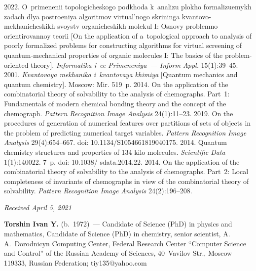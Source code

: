   \begin{multicols}{2}

\renewcommand{\bibname}{\protect\rmfamily References}

{\small\frenchspacing
 {%
 \begin{thebibliography}{9}
 2022. O~primenenii topologicheskogo podkhoda k~analizu plokho 
formalizuemykh zadach dlya postroeniya algoritmov virtual'nogo skrininga  
kvantovo-mekhanicheskikh svoystv organicheskikh molekul I: Osno\-vy problemno 
orientirovannoy teorii [On the application of a~topological approach to analysis of poorly 
formalized problems for constructing algorithms for virtual screening of quantum-mechanical 
properties of organic molecules I: The basics of the problem-oriented theory]. \textit{Informatika 
i~ee Primeneniya~--- Inform Appl.} 15(1):39--45.
 2001. \textit{Kvantovaya mekhanika i~kvantovaya khimiya} [Quantum 
mechanics and quantum chemistry]. Moscow: Mir. 519~p.
 2014. On the application of the combinatorial theory 
of solvability to the analysis of chemographs. Part~1: Fundamentals of modern chemical bonding 
theory and the concept of the chemograph. \textit{Pattern Recognition Image Analysis}  
24(1):11--23.
 2019. On the procedures of generation of numerical 
features over partitions of sets of objects in the problem of predicting numerical target variables. 
\textit{Pattern Recognition Image Analysis} 29(4):654--667. doi: 10.1134/S1054661819040175.
 2014. Quantum chemistry structures and 
properties of 134 kilo molecules. \textit{Scientific Data} 1(1):140022. 7~p. doi: 10.1038/ sdata.2014.22.
 2014. On the application of the combinatorial theory 
of solvability to the analysis of chemographs. Part~2: Local completeness of invariants of 
chemographs in view of the combinatorial theory of solvability. \textit{Pattern Recognition Image 
Analysis} 24(2):196--208.
\end{thebibliography}

 }
 }

\end{multicols}

\vspace*{-6pt}

\hfill{\small\textit{Received April 5, 2021}}

  \Contrl
  
  \noindent
  \textbf{Torshin Ivan Y.} (b.\ 1972)~--- Candidate of Science (PhD) in physics and mathematics, 
Candidate of Science (PhD) in chemistry, senior scientist, A.\,A.~Dorodnicyn Computing Center, 
Federal Research Center ``Computer Science and Control'' of the Russian Academy of Sciences, 
40~Vavilov Str., Moscow 119333, Russian Federation; \mbox{tiy135@yahoo.com}
  


\label{end\stat}

\renewcommand{\bibname}{\protect\rm Литература}    